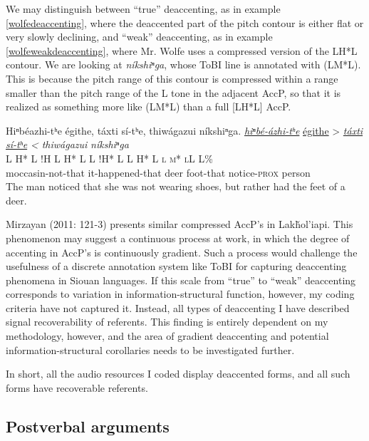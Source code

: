 \documentclass[output=paper]{LSP/langsci}
\begin{document}
We may distinguish between “true” deaccenting, as in example \ref{wolfedeaccenting}, where the deaccented part of the pitch contour is either flat or very slowly declining, and “weak” deaccenting, as in example \ref{wolfeweakdeaccenting}, where Mr. Wolfe uses a compressed version of the LH*L contour. We are looking at \textit{níkshiⁿga}, whose ToBI line is annotated with (LM*L). This is because the pitch range of this contour is compressed within a range smaller than the pitch range of the L tone in the adjacent AccP, so that it is realized as something more like (LM*L) than a full [LH*L] AccP.

\ea\label{wolfeweakdeaccenting}
Hiⁿbéazhi-tʰe égithe, táxti sí-tʰe, thiwágazui níkshiⁿga.\footnotemark
\glll	\emph{\underline{hiⁿbé-ázhi-tʰe}}	{\underline{égithe} >}				\emph{\underline{táxti}}		\emph{\underline{sí-tʰe} <}		\emph{thiwágazui}	\emph{níkshiⁿga}\\
	{\ob L H* L}					{\cb{}!H}	{\ob L H* L\cb}			{\ob L !H* L\cb}				{\ob L H* L}			{\op \textsc{l m* l}\cp\cb{}L L\%}\\
	moccasin-not-that				it-happened-that					deer					foot-that				notice-\textsc{prox}		person\\
\glt	The man noticed that she was not wearing shoes, but rather had the feet of a deer.
\z

Mirzayan (2011: 121-3) presents similar compressed AccP’s in Lakȟol’iapi. This phenomenon may suggest a continuous process at work, in which the degree of accenting in AccP’s is continuously gradient. Such a process would challenge the usefulness of a discrete annotation system like ToBI for capturing deaccenting phenomena in Siouan languages. If this scale from “true” to “weak” deaccenting corresponds to variation in information-structural function, however, my coding criteria have not captured it. Instead, all types of deaccenting I have described signal recoverability of referents. This finding is entirely dependent on my methodology, however, and the area of gradient deaccenting and potential information-structural corollaries needs to be investigated further.

In short, all the audio resources I coded display deaccented forms, and all such forms have recoverable referents.

\subsection{Postverbal arguments}\label{postverbalarguments}
\end{document}
